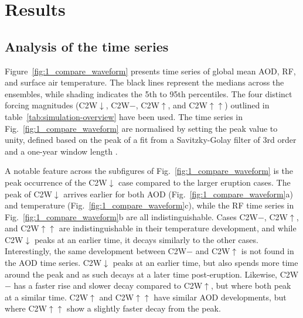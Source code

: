 \documentclass[draft]{agujournal2019}
\begin{document}
\section{Results}\label{sec:results}


\subsection{Analysis of the time series}

Figure~\ref{fig:1_compare_waveform} presents time series of global mean AOD, RF, and
surface air temperature. The black lines represent the medians across the ensembles,
while shading indicates the 5th to 95th percentiles. The four distinct forcing
magnitudes (C2W\(\downarrow\), C2W\(-\), C2W\(\uparrow\), and C2W\(\uparrow\uparrow\))
outlined in table~\ref{tab:simulation-overview} have been used. The time series in
Fig.~\ref{fig:1_compare_waveform} are normalised by setting the peak value to unity,
defined based on the peak of a fit from a Savitzky-Golay filter of 3rd order and a
one-year window length \cite{savitzky1964}.

A notable feature across the subfigures of Fig.~\ref{fig:1_compare_waveform} is the peak
occurrence of the C2W\(\downarrow\) case compared to the larger eruption cases. The peak
of C2W\(\downarrow\) arrives earlier for both AOD (Fig.~\ref{fig:1_compare_waveform}a)
and temperature (Fig.~\ref{fig:1_compare_waveform}c), while the RF time series in
Fig.~\ref{fig:1_compare_waveform}b are all indistinguishable. Cases C2W\(-\),
C2W\(\uparrow\), and C2W\(\uparrow\uparrow\) are indistinguishable in their temperature
development, and while C2W\(\downarrow\) peaks at an earlier time, it decays similarly
to the other cases. Interestingly, the same development between C2W\(-\) and
C2W\(\uparrow\) is not found in the AOD time series. C2W\(\downarrow\) peaks at an
earlier time, but also spends more time around the peak and as such decays at a later
time post-eruption. Likewise, C2W\(-\) has a faster rise and slower decay compared to
C2W\(\uparrow\), but where both peak at a similar time. C2W\(\uparrow\) and
C2W\(\uparrow\uparrow\) have similar AOD developments, but where C2W\(\uparrow\uparrow\)
show a slightly faster decay from the peak.
\end{document}
